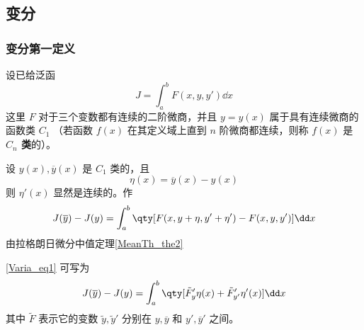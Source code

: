 \subsection{变分}\label{Varia_sub1}
\subsubsection{变分第一定义}
设已给泛函
\begin{equation}
J=\int_a^b F(x,y,y')\dd x
\end{equation}
这里 $F$ 对于三个变数都有连续的二阶微商，并且 $y=y(x)$ 属于具有连续微商的函数类 $C_1$ （若函数 $f(x)$ 在其定义域上直到 $n$ 阶微商都连续，则称 $f(x)$ 是\textbf{ $C_n$ 类}的）。

设 $y(x),\overline{y}(x)$ 是 $C_1$ 类的，且
\begin{equation}
\eta(x)=\overline{y}(x)-y(x)
\end{equation}
则 $\eta'(x)$ 显然是连续的。作
\begin{equation}\label{Varia_eq1}
J(\overline{y})-J(y)=\int_a^b\qty[F(x,y+\eta,y'+\eta')-F(x,y,y')]\dd x
\end{equation}
由拉格朗日微分中值定理\autoref{MeanTh_the2}~
\begin{issues}
\end{issues}
\autoref{Varia_eq1} 可写为
\begin{equation}
J(\overline{y})-J(y)=\int_a^b\qty[\tilde{F}'_y\eta(x)+\tilde{F}'_{y'}\eta'(x)]\dd x
\end{equation}
其中 $\tilde{F}$ 表示它的变数 $\tilde{y},\tilde{y}'$ 分别在 $y,\overline{y}$ 和 $y',\overline{y}'$ 之间。

